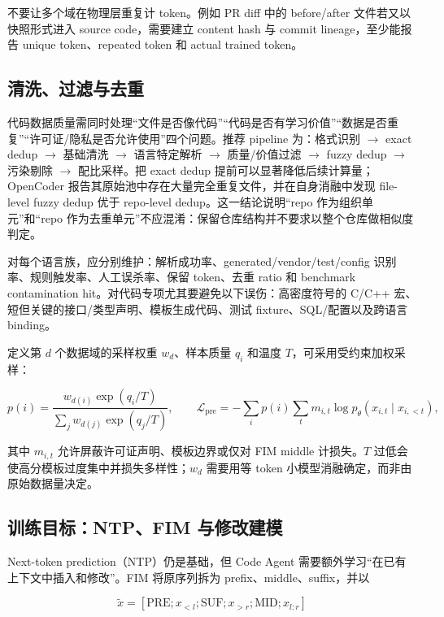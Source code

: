 \documentclass[10pt,a4paper,UTF8,fontset=none]{ctexart}
\begin{document}
不要让多个域在物理层重复计 token。例如 PR diff 中的 before/after 文件若又以快照形式进入 source code，需要建立 content hash 与 commit lineage，至少能报告 unique token、repeated token 和 actual trained token。

\subsection{清洗、过滤与去重}

代码数据质量需同时处理“文件是否像代码”“代码是否有学习价值”“数据是否重复”“许可证/隐私是否允许使用”四个问题。推荐 pipeline 为：格式识别 $\rightarrow$ exact dedup $\rightarrow$ 基础清洗 $\rightarrow$ 语言特定解析 $\rightarrow$ 质量/价值过滤 $\rightarrow$ fuzzy dedup $\rightarrow$ 污染剔除 $\rightarrow$ 配比采样。把 exact dedup 提前可以显著降低后续计算量；OpenCoder 报告其原始池中存在大量完全重复文件，并在自身消融中发现 file-level fuzzy dedup 优于 repo-level dedup\cite{huang2024opencoder}。这一结论说明“repo 作为组织单元”和“repo 作为去重单元”不应混淆：保留仓库结构并不要求以整个仓库做相似度判定。

对每个语言族，应分别维护：解析成功率、generated/vendor/test/config 识别率、规则触发率、人工误杀率、保留 token、去重 ratio 和 benchmark contamination hit。对代码专项尤其要避免以下误伤：高密度符号的 C/C++ 宏、短但关键的接口/类型声明、模板生成代码、测试 fixture、SQL/配置以及跨语言 binding。

定义第 $d$ 个数据域的采样权重 $w_d$、样本质量 $q_i$ 和温度 $T$，可采用受约束加权采样：

\begin{equation}
p(i)=\frac{w_{d(i)}\exp(q_i/T)}{\sum_j w_{d(j)}\exp(q_j/T)},
\qquad
\mathcal{L}_{\mathrm{pre}}=-\sum_i p(i)\sum_t m_{i,t}\log p_\theta(x_{i,t}\mid x_{i,<t}),
\label{eq:pretrain}
\end{equation}

其中 $m_{i,t}$ 允许屏蔽许可证声明、模板边界或仅对 FIM middle 计损失。$T$ 过低会使高分模板过度集中并损失多样性；$w_d$ 需要用等 token 小模型消融确定，而非由原始数据量决定。

\subsection{训练目标：NTP、FIM 与修改建模}

Next-token prediction（NTP）仍是基础，但 Code Agent 需要额外学习“在已有上下文中插入和修改”。FIM 将原序列拆为 prefix、middle、suffix，并以

\begin{equation}
\tilde{x}=[\mathrm{PRE};x_{<l};\mathrm{SUF};x_{>r};\mathrm{MID};x_{l:r}]
\label{eq:fim}
\end{equation}
\end{document}
